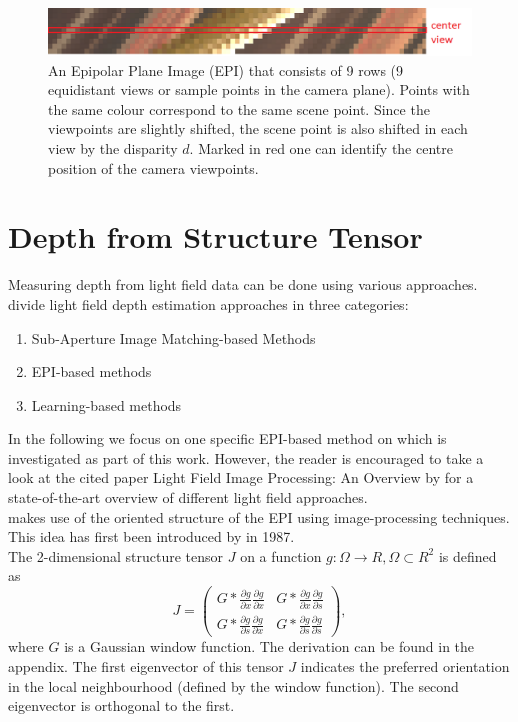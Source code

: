 \documentclass  [
  paper    = a4,
  BCOR     = 10mm,
  twoside,
  fontsize = 12pt,
  fleqn,
  toc      = bibnumbered,
  toc      = listofnumbered,
  numbers  = noendperiod,
  headings = normal,
  listof   = leveldown,
  version  = 3.03
]                                       {scrreprt}
\begin{document}
\begin{figure}
	\centering
	\includegraphics[width=1\linewidth]{images/simple_epi}
	\caption[Example Epipolar Plane image]{An Epipolar Plane Image (EPI) that consists of 9 rows (9 equidistant views or sample points in the camera plane). Points with the same colour correspond to the same scene point. Since the viewpoints are slightly shifted, the scene point is also shifted in each view by the disparity $d$. Marked in red one can identify the centre position of the camera viewpoints.}
	\label{fig:simpleepi}
\end{figure}


\section{Depth from Structure Tensor}
Measuring depth from light field data can be done using various approaches.
\cite{wu2017light} divide light field depth estimation approaches in three categories:
\begin{enumerate}
	\item Sub-Aperture Image Matching-based Methods
	\item EPI-based methods
	\item Learning-based methods
\end{enumerate}
In the following we focus on one specific EPI-based method on which is investigated as part of this work. However, the reader is encouraged to take a look at the cited paper \glqq Light Field Image Processing: An Overview \grqq by \cite{wu2017light} for a state-of-the-art overview of different light field approaches.\\
\cite{wanner2014orientation} makes use of the oriented structure of the EPI using image-processing techniques. This idea has first been introduced by \cite{bigun1987optimal} in 1987.\\

The 2-dimensional structure tensor $J$  on a function $g:\Omega \rightarrow \!R, \Omega \subset \!R^2 $ is defined as
\begin{equation}\label{eq:structuretensor}
J =\left(
\begin{matrix}
G*\frac{\partial g}{\partial x}\frac{\partial g}{\partial x} & G*\frac{\partial g}{\partial x}\frac{\partial g}{\partial s} \\
G*\frac{\partial g}{\partial s}\frac{\partial g}{\partial x} & G*\frac{\partial g}{\partial s}\frac{\partial g}{\partial s} 
\end{matrix}\right),
\end{equation}
 where $G$ is a Gaussian window function. The derivation can be found in the appendix.
 The first eigenvector of this tensor $J$ indicates the preferred orientation in the local neighbourhood (defined by the window function). The second eigenvector is orthogonal to the first. 
 
\end{document}

